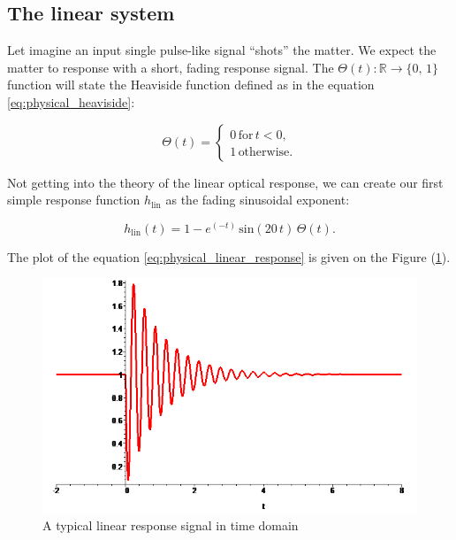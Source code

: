 \documentclass[12pt,twoside,a4paper]{article}
\numberwithin{equation}{subsection}
\numberwithin{figure}{subsection}
\begin{document}
\subsection{The linear system} \label{chap:physical_linearsystem}

Let imagine an input single pulse-like signal ``shots'' the matter. We expect the matter to response with a short, fading response signal.
The $ \Theta (t) : \mathbb{R} \rightarrow \{0, \, 1 \} $ function will state the Heaviside function defined as in the equation
\ref{eq:physical_heaviside}:

\begin{equation} \label{eq:physical_heaviside}
   \Theta(t)  =  
   \begin{cases}
     0 \, \text{for} \, t < 0, \\
     1 \, \text{otherwise}.
   \end{cases}
\end{equation}

Not getting into the theory of the linear optical response, we can create our first simple response function $ h_{\text{lin}} $ as the
fading sinusoidal exponent:

\begin{equation} \label{eq:physical_linear_response}
  h_{\text{lin}} (t) = 1 - e^{( - t)}\,\mathrm{sin}(20\,t)\,\Theta (t) .
\end{equation}

The plot of the equation \ref{eq:physical_linear_response} is given on the Figure (\ref{fig:physical_linplot}).

\begin{figure}[H]
  \includegraphics[width=150mm]{img/lin_plot.png}
  \caption{A typical linear response signal in time domain \label{fig:physical_linplot}}
\end{figure}
\end{document}
